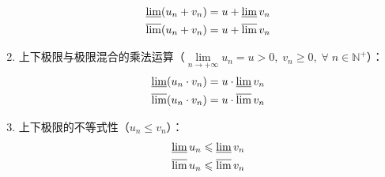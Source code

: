 \begin{theorem}
\begin{enumerate}
\begin{gather*}
			\varliminf(u_n+v_n)=u+\varliminf v_n \\
			\varlimsup(u_n+v_n)=u+\varlimsup v_n
		\end{gather*}
		\item 上下极限与极限混合的乘法运算（$\lim\limits_{n\to+\infty}u_n=u>0,\;v_n\geqslant0,\;\forall\;n\in\mathbb{N}^+$）：
		\begin{gather*}
			\varliminf(u_n\cdot v_n)=u\cdot\varliminf v_n \\
			\varlimsup(u_n\cdot v_n)=u\cdot\varlimsup v_n
		\end{gather*}
		\item 上下极限的不等式性（$u_n\leqslant v_n$）：
		\begin{gather*}
			\varliminf u_n\leqslant\varliminf v_n \\
			\varlimsup u_n\leqslant\varlimsup v_n
		\end{gather*}
	\end{enumerate}
\end{theorem}
